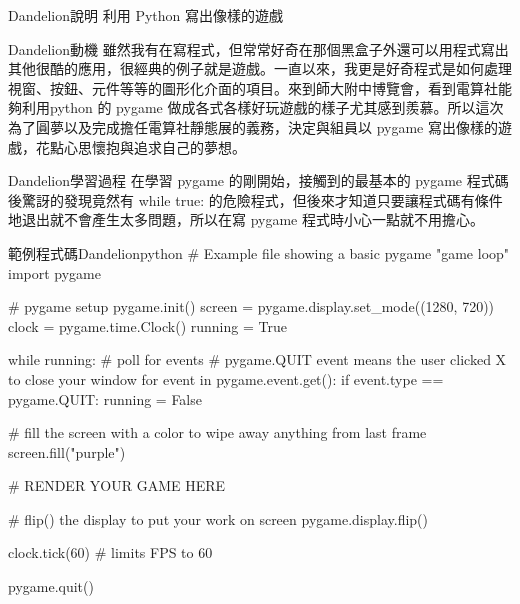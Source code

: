 \documentclass{article}
\begin{document}

\begin{large}
\begin{boxpar}{Dandelion}{說明}
利用 Python 寫出像樣的遊戲
\end{boxpar}
\begin{boxpar}{Dandelion}{動機}
雖然我有在寫程式，但常常好奇在那個黑盒子外還可以用程式寫出其他很酷的應用，很經典的例子就是遊戲。一直以來，我更是好奇程式是如何處理視窗、按鈕、元件等等的圖形化介面的項目。來到師大附中博覽會，看到電算社能夠利用python
的 pygame
做成各式各樣好玩遊戲的樣子尤其感到羨慕。所以這次為了圓夢以及完成擔任電算社靜態展的義務，決定與組員以
pygame 寫出像樣的遊戲，花點心思懷抱與追求自己的夢想。
\end{boxpar}
    \begin{boxpar}{Dandelion}{學習過程}
        在學習 pygame 的剛開始，接觸到的最基本的 pygame 程式碼後驚訝的發現竟然有 while true:
        的危險程式，但後來才知道只要讓程式碼有條件地退出就不會產生太多問題，所以在寫
        pygame 程式時小心一點就不用擔心。
        \begin{mintbox}{範例程式碼}{Dandelion}{python}
# Example file showing a basic pygame "game loop"
import pygame

# pygame setup
pygame.init()
screen = pygame.display.set_mode((1280, 720))
clock = pygame.time.Clock()
running = True

while running:
    # poll for events
    # pygame.QUIT event means the user clicked X to close your window
    for event in pygame.event.get():
        if event.type == pygame.QUIT:
            running = False

    # fill the screen with a color to wipe away anything from last frame
    screen.fill("purple")

    # RENDER YOUR GAME HERE

    # flip() the display to put your work on screen
    pygame.display.flip()

    clock.tick(60)  # limits FPS to 60

pygame.quit()
        \end{mintbox}
    \end{boxpar}


\end{large}
\end{document}
